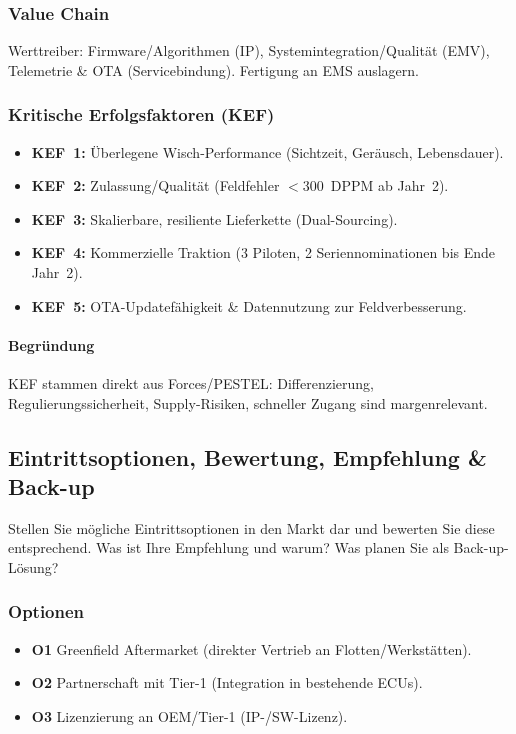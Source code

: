 \documentclass[
%
ngerman %
%
numeric %
]{wbh-assignment}
\begin{document}
\subsubsection{Value Chain}
Werttreiber: Firmware/Algorithmen (IP), Systemintegration/Qualität (EMV), Telemetrie \& OTA (Servicebindung). Fertigung an EMS auslagern.

\subsubsection{Kritische Erfolgsfaktoren (KEF)}
\begin{itemize}
  \item \textbf{KEF~1:} Überlegene Wisch-Performance (Sichtzeit, Geräusch, Lebensdauer).
  \item \textbf{KEF~2:} Zulassung/Qualität (Feldfehler $<300$~DPPM ab Jahr~2).
  \item \textbf{KEF~3:} Skalierbare, resiliente Lieferkette (Dual-Sourcing).
  \item \textbf{KEF~4:} Kommerzielle Traktion (3 Piloten, 2 Seriennominationen bis Ende Jahr~2).
  \item \textbf{KEF~5:} OTA-Updatefähigkeit \& Datennutzung zur Feldverbesserung.
\end{itemize}
\paragraph{Begründung}
KEF stammen direkt aus Forces/PESTEL: Differenzierung, Regulierungssicherheit, Supply-Risiken, schneller Zugang sind margenrelevant.

\bigskip

\subsection{Eintrittsoptionen, Bewertung, Empfehlung \& Back-up}
\begin{aufgabenstellung}
Stellen Sie mögliche Eintrittsoptionen in den Markt dar und bewerten Sie diese entsprechend.
Was ist Ihre Empfehlung und warum? Was planen Sie als Back-up-Lösung?
\end{aufgabenstellung}

\vspace*{5mm}

\subsubsection{Optionen}
\begin{itemize}
  \item \textbf{O1} Greenfield Aftermarket (direkter Vertrieb an Flotten/Werkstätten).
  \item \textbf{O2} Partnerschaft mit Tier-1 (Integration in bestehende ECUs).
  \item \textbf{O3} Lizenzierung an OEM/Tier-1 (IP-/SW-Lizenz).
\end{itemize}
\end{document}
